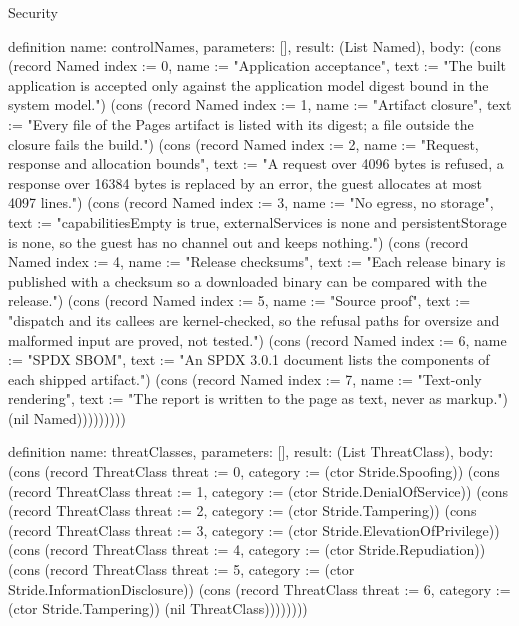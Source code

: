 \begin{lexlean}{Security}
\begin{semanticmodule}
definition{
  name: controlNames,
  parameters: [],
  result: (List Named),
  body: (cons (record Named {index := 0, name := "Application acceptance", text := "The built application is accepted only against the application model digest bound in the system model."}) (cons (record Named {index := 1, name := "Artifact closure", text := "Every file of the Pages artifact is listed with its digest; a file outside the closure fails the build."}) (cons (record Named {index := 2, name := "Request, response and allocation bounds", text := "A request over 4096 bytes is refused, a response over 16384 bytes is replaced by an error, the guest allocates at most 4097 lines."}) (cons (record Named {index := 3, name := "No egress, no storage", text := "capabilitiesEmpty is true, externalServices is none and persistentStorage is none, so the guest has no channel out and keeps nothing."}) (cons (record Named {index := 4, name := "Release checksums", text := "Each release binary is published with a checksum so a downloaded binary can be compared with the release."}) (cons (record Named {index := 5, name := "Source proof", text := "dispatch and its callees are kernel-checked, so the refusal paths for oversize and malformed input are proved, not tested."}) (cons (record Named {index := 6, name := "SPDX SBOM", text := "An SPDX 3.0.1 document lists the components of each shipped artifact."}) (cons (record Named {index := 7, name := "Text-only rendering", text := "The report is written to the page as text, never as markup."}) (nil Named)))))))))
}

definition{
  name: threatClasses,
  parameters: [],
  result: (List ThreatClass),
  body: (cons (record ThreatClass {threat := 0, category := (ctor Stride.Spoofing)}) (cons (record ThreatClass {threat := 1, category := (ctor Stride.DenialOfService)}) (cons (record ThreatClass {threat := 2, category := (ctor Stride.Tampering)}) (cons (record ThreatClass {threat := 3, category := (ctor Stride.ElevationOfPrivilege)}) (cons (record ThreatClass {threat := 4, category := (ctor Stride.Repudiation)}) (cons (record ThreatClass {threat := 5, category := (ctor Stride.InformationDisclosure)}) (cons (record ThreatClass {threat := 6, category := (ctor Stride.Tampering)}) (nil ThreatClass))))))))
}


\end{semanticmodule}
\end{lexlean}
